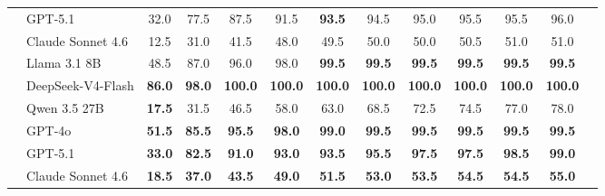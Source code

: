 \begin{table}[htbp]
{\begin{tabular}{llccccccccccc}
                                 & GPT-5.1           & 32.0                       & 77.5          & 87.5           & 91.5           & \textbf{93.5}  & 94.5           & 95.0           & 95.5           & 95.5           & 96.0           \\
                                 & Claude Sonnet 4.6 & 12.5                       & 31.0          & 41.5           & 48.0           & 49.5           & 50.0           & 50.0           & 50.5           & 51.0           & 51.0           \\
                  \midrule
                                 & Llama 3.1 8B      & 48.5                       & 87.0          & 96.0           & 98.0           & \textbf{99.5}  & \textbf{99.5}  & \textbf{99.5}  & \textbf{99.5}  & \textbf{99.5}  & \textbf{99.5}  \\
                                 & DeepSeek-V4-Flash & \textbf{86.0}              & \textbf{98.0} & \textbf{100.0} & \textbf{100.0} & \textbf{100.0} & \textbf{100.0} & \textbf{100.0} & \textbf{100.0} & \textbf{100.0} & \textbf{100.0} \\
                                 & Qwen 3.5 27B      & \textbf{17.5}              & 31.5          & 46.5           & 58.0           & 63.0           & 68.5           & 72.5           & 74.5           & 77.0           & 78.0           \\
                                 & GPT-4o            & \textbf{51.5}              & \textbf{85.5} & \textbf{95.5}  & \textbf{98.0}  & \textbf{99.0}  & \textbf{99.5}  & \textbf{99.5}  & \textbf{99.5}  & \textbf{99.5}  & \textbf{99.5}  \\
                                 & GPT-5.1           & \textbf{33.0}              & \textbf{82.5} & \textbf{91.0}  & \textbf{93.0}  & \textbf{93.5}  & \textbf{95.5}  & \textbf{97.5}  & \textbf{97.5}  & \textbf{98.5}  & \textbf{99.0}  \\
                                 & Claude Sonnet 4.6 & \textbf{18.5}              & \textbf{37.0} & \textbf{43.5}  & \textbf{49.0}  & \textbf{51.5}  & \textbf{53.0}  & \textbf{53.5}  & \textbf{54.5}  & \textbf{54.5}  & \textbf{55.0}  \\
                  \bottomrule
            \end{tabular}
      }
\end{table}

